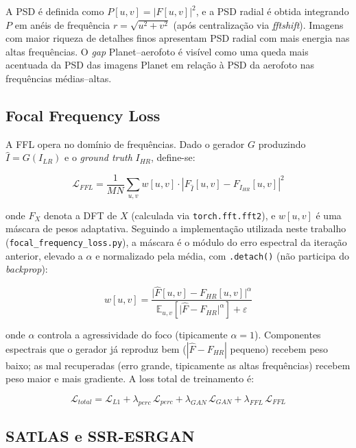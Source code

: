 \documentclass[12pt, a4paper]{article}
\begin{document}
A PSD é definida como $P[u,v] = |F[u,v]|^2$, e a PSD radial é obtida integrando
$P$ em anéis de frequência $r = \sqrt{u^2 + v^2}$ (após centralização via
\textit{fftshift}). Imagens com maior riqueza de detalhes finos apresentam PSD
radial com mais energia nas altas frequências. O \textit{gap} Planet--aerofoto
é visível como uma queda mais acentuada da PSD das imagens Planet em relação
à PSD da aerofoto nas frequências médias--altas.

\subsection{Focal Frequency Loss}

A FFL opera no domínio de frequências. Dado o gerador $G$ produzindo $\hat{I}=G(I_{LR})$
e o \textit{ground truth} $I_{HR}$, define-se:

\begin{equation}
    \mathcal{L}_{FFL} = \frac{1}{MN} \sum_{u,v} w[u,v] \cdot \left|F_{\hat{I}}[u,v] - F_{I_{HR}}[u,v]\right|^2
\end{equation}

onde $F_X$ denota a DFT de $X$ (calculada via \texttt{torch.fft.fft2}), e
$w[u,v]$ é uma máscara de pesos adaptativa. Seguindo a implementação utilizada
neste trabalho (\texttt{focal\_frequency\_loss.py}), a máscara é o módulo do erro
espectral da iteração anterior, elevado a $\alpha$ e normalizado pela média, com
\texttt{.detach()} (não participa do \textit{backprop}):

\begin{equation}
    w[u,v] = \frac{\bigl|\hat{F}[u,v] - F_{HR}[u,v]\bigr|^{\alpha}}
                  {\mathbb{E}_{u,v}\!\left[\bigl|\hat{F} - F_{HR}\bigr|^{\alpha}\right] + \varepsilon}
\end{equation}

onde $\alpha$ controla a agressividade do foco (tipicamente $\alpha=1$).
Componentes espectrais que o gerador já reproduz bem ($|\hat{F}-F_{HR}|$ pequeno)
recebem peso baixo; as mal recuperadas (erro grande, tipicamente as altas
frequências) recebem peso maior e mais gradiente. A loss total de treinamento é:

\begin{equation}
    \mathcal{L}_{total} = \mathcal{L}_{L1} + \lambda_{perc}\,\mathcal{L}_{perc} + \lambda_{GAN}\,\mathcal{L}_{GAN} + \lambda_{FFL}\,\mathcal{L}_{FFL}
\end{equation}

\subsection{SATLAS e SSR-ESRGAN}
\end{document}

